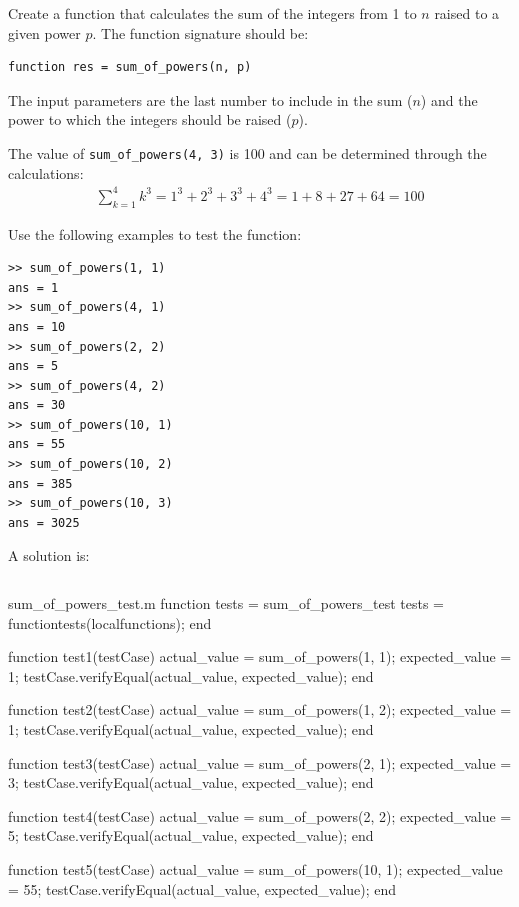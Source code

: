 \begin{ex}
Create a function that calculates the sum of the 
integers from 1 to $n$ raised to a given power $p$.
The function signature should be:
\begin{lstlisting}
function res = sum_of_powers(n, p)
\end{lstlisting}
The input parameters are the last number to include in the 
sum ($n$) and the power to which the integers should be raised ($p$).

The value of \verb!sum_of_powers(4, 3)! is 100
and can be determined through the calculations:
\begin{align*}
\sum_{k = 1}^4 k^3 = 1^3 + 2^3 + 3^3 + 4^3 = 1 + 8 + 27 + 64 = 100
\end{align*}

Use the following examples to test the function:
\begin{lstlisting}
>> sum_of_powers(1, 1)
ans = 1
>> sum_of_powers(4, 1)
ans = 10
>> sum_of_powers(2, 2)
ans = 5
>> sum_of_powers(4, 2)
ans = 30
>> sum_of_powers(10, 1)
ans = 55
>> sum_of_powers(10, 2)
ans = 385
>> sum_of_powers(10, 3)
ans = 3025
\end{lstlisting}
\begin{hint}
\end{hint}
\begin{sol}
A solution is:
\begin{lstlisting}
\end{lstlisting}
\begin{solutionfile}{sum_of_powers_test.m}
function tests = sum_of_powers_test
    tests = functiontests(localfunctions);
end
 

function test1(testCase)
    actual_value = sum_of_powers(1, 1);
    expected_value = 1;
    testCase.verifyEqual(actual_value, expected_value);
end

function test2(testCase)
    actual_value = sum_of_powers(1, 2);
    expected_value = 1;
    testCase.verifyEqual(actual_value, expected_value);
end

function test3(testCase)
    actual_value = sum_of_powers(2, 1);
    expected_value = 3;
    testCase.verifyEqual(actual_value, expected_value);
end

function test4(testCase)
    actual_value = sum_of_powers(2, 2);
    expected_value = 5;
    testCase.verifyEqual(actual_value, expected_value);
end

function test5(testCase)
    actual_value = sum_of_powers(10, 1);
    expected_value = 55;
    testCase.verifyEqual(actual_value, expected_value);
end


\end{solutionfile}
\end{sol}
\end{ex}
